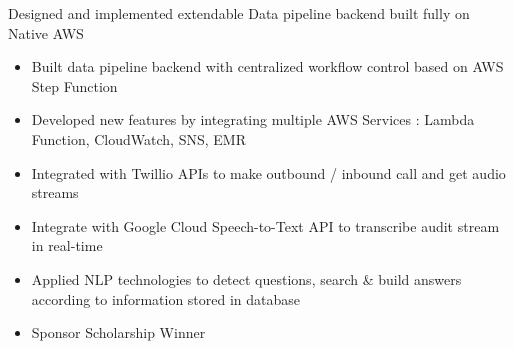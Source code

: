 \documentclass[10pt,a4paper,ragged2e,withhyper]{altacv}
\begin{document}
\begin{paracol}{2}
  \divider


   {Designed and implemented extendable Data pipeline backend built fully on Native AWS}
  \begin{itemize}
    \item Built data pipeline backend with centralized workflow control based on AWS Step Function
    \item Developed new features by integrating multiple AWS Services : Lambda Function, CloudWatch, SNS, EMR
  \end{itemize}

  \divider


  \begin{itemize}
    \item Integrated with Twillio APIs to make outbound / inbound call and get audio streams
    \item Integrate with Google Cloud Speech-to-Text API to transcribe audit stream in real-time
    \item Applied NLP technologies to detect questions, search \& build answers according to information stored in database
    \item Sponsor Scholarship Winner
  \end{itemize}

  \switchcolumn

  





  \par
  \bigskip\normalsize


\end{paracol}
\end{document}
